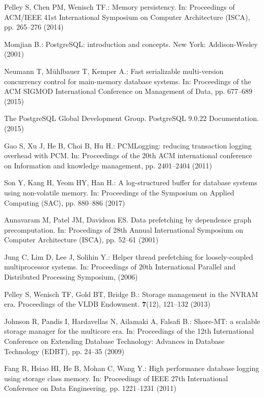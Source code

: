 Pelley S, Chen PM, Wenisch TF.: Memory persistency. In: Proceedings of ACM/IEEE 41st International Symposium on Computer Architecture (ISCA), pp. 265--276 (2014)

Momjian B.: PostgreSQL: introduction and concepts. New York: Addison-Wesley (2001)

Neumann T, M\"{u}hlbauer T, Kemper A.: Fast serializable multi-version concurrency control for main-memory database systems. In: Proceedings of the ACM SIGMOD International Conference on Management of Data, pp. 677--689 (2015)

The PostgreSQL Global Development Group. PostgreSQL 9.0.22 Documentation. (2015)

Gao S, Xu J, He B, Choi B, Hu H.: PCMLogging: reducing transaction logging overhead with PCM. In: Proceedings of the 20th ACM international conference on Information and knowledge management, pp. 2401--2404 (2011)

Son Y, Kang H, Yeom HY, Han H.: A log-structured buffer for database systems using non-volatile memory. In: Proceedings of the Symposium on Applied Computing (SAC), pp. 880--886 (2017)

Annavaram M, Patel JM, Davidson ES. Data prefetching by dependence graph precomputation. In: Procedings of 28th Annual International Symposium on Computer Architecture (ISCA), pp. 52--61 (2001)

Jung C, Lim D, Lee J, Solihin Y.: Helper thread prefetching for loosely-coupled multiprocessor systems. In: Proceedings of 20th International Parallel and Distributed Processing Symposium, (2006)

Pelley S, Wenisch TF, Gold BT, Bridge B.: Storage management in the NVRAM era. Proceedings of the VLDB Endowment. \textbf{7}(12), 121--132 (2013)

Johnson R, Pandis I, Hardavellas N, Ailamaki A, Falsafi B.: Shore-MT: a scalable storage manager for the multicore era. In: Proceedings of the 12th International Conference on Extending Database Technology: Advances in Database Technology (EDBT), pp. 24--35 (2009)

Fang R, Hsiao HI, He B, Mohan C, Wang Y.: High performance database logging using storage class memory. In: Proceedings of IEEE 27th International Conference on Data Engineering, pp. 1221--1231 (2011)

